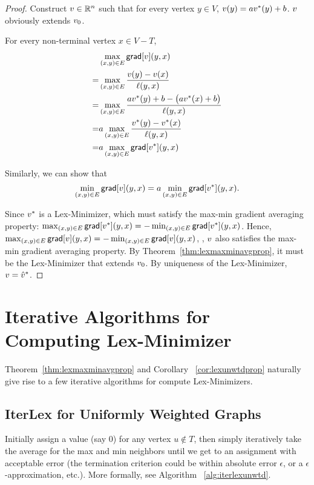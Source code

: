 \documentclass[12pt]{amsart}
\newcommand{\grad}{\ensuremath{\mathsf{grad}}}
\begin{document}
\begin{proof}
Construct $v\in \mathbb R^n$ such that for every vertex $y\in V$, $v(y) = av^*(y) + b$. $v$ obviously extends $v_0$.

For every non-terminal vertex $x\in V-T$,
\begin{align*}
 &\max_{(x,y)\in E}\grad[\V{v}](y,x) \\
=&\max_{(x,y)\in E}\frac{\V{v}(y)-\V{v}(x)}{\ell(y,x)} \\
=&\max_{(x,y)\in E}\frac{a\V{v}^*(y)+b-\paren{a\V{v}^*(x)+b}}{\ell(y,x)} \\
=&a\max_{(x,y)\in E}\frac{\V{v}^*(y)-\V{v}^*(x)}{\ell(y,x)} \\
=&a\max_{(x,y)\in E}\grad[\V{v}^*](y,x)
\end{align*}

Similarly, we can show that $$\min_{(x,y)\in E}\grad[\V{v}](y,x) = a\min_{(x,y)\in E}\grad[\V{v}^*](y,x).$$

Since $v^*$ is a Lex-Minimizer, which must satisfy the max-min gradient averaging property: $\max_{(x,y)\in E}\grad[\V{v}^*](y,x) = -\min_{(x,y)\in E}\grad[\V{v}^*](y,x)$. Hence, $\max_{(x,y)\in E}\grad[\V{v}](y,x) = -\min_{(x,y)\in E}\grad[\V{v}](y,x)$, \ie, $v$ also satisfies the max-min gradient averaging property. By Theorem~\ref{thm:lexmaxminavgprop}, it must be the Lex-Minimizer that extends $v_0$. By uniqueness of the Lex-Minimizer, $v = \hat{v}^*$.

\end{proof}


\section{Iterative Algorithms for Computing Lex-Minimizer}\label{sec:iteralgs}
Theorem~\ref{thm:lexmaxminavgprop} and Corollary ~\ref{cor:lexunwtdprop} naturally give rise to a few iterative algorithms for compute Lex-Minimizers.

\subsection{IterLex for Uniformly Weighted Graphs}
Initially assign a value (say $0$) for any vertex $u\notin T$, then simply iteratively take the average for the max and min neighbors until we get to an assignment with acceptable error (the termination criterion could be within absolute error $\epsilon$, or a $\epsilon$-approximation, etc.). More formally,
see Algorithm ~\ref{alg:iterlexunwtd}.
\end{document}
